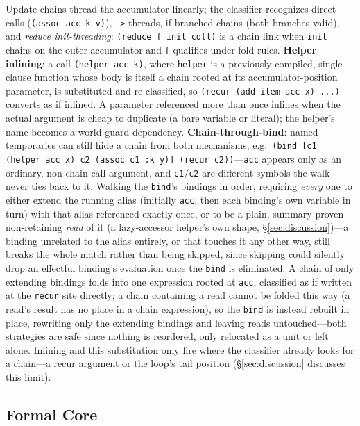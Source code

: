 \documentclass[sigplan,review,anonymous]{acmart}
\begin{document}
Update chains thread the accumulator linearly; the classifier recognizes direct calls (\texttt{(assoc acc k v)}), \texttt{->} threads, if-branched chains (both branches valid), and \emph{reduce init-threading}: \texttt{(reduce f init coll)} is a chain link when \texttt{init} chains on the outer accumulator and \texttt{f} qualifies under fold rules. \textbf{Helper inlining}: a call \texttt{(helper acc k)}, where \texttt{helper} is a previously-compiled, single-clause function whose body is itself a chain rooted at its accumulator-position parameter, is substituted and re-classified, so \texttt{(recur (add-item acc x) ...)} converts as if inlined. A parameter referenced more than once inlines when the actual argument is cheap to duplicate (a bare variable or literal); the helper's name becomes a world-guard dependency. \textbf{Chain-through-bind}: named temporaries can still hide a chain from both mechanisms, e.g.\ \texttt{(bind [c1 (helper acc x) c2 (assoc c1 :k y)] (recur c2))}---\texttt{acc} appears only as an ordinary, non-chain call argument, and \texttt{c1}/\texttt{c2} are different symbols the walk never ties back to it. Walking the \texttt{bind}'s bindings in order, requiring \emph{every} one to either extend the running alias (initially \texttt{acc}, then each binding's own variable in turn) with that alias referenced exactly once, or to be a plain, summary-proven non-retaining \emph{read} of it (a lazy-accessor helper's own shape, §\ref{sec:discussion})---a binding unrelated to the alias entirely, or that touches it any other way, still breaks the whole match rather than being skipped, since skipping could silently drop an effectful binding's evaluation once the \texttt{bind} is eliminated. A chain of only extending bindings folds into one expression rooted at \texttt{acc}, classified as if written at the \texttt{recur} site directly; a chain containing a read cannot be folded this way (a read's result has no place in a chain expression), so the \texttt{bind} is instead rebuilt in place, rewriting only the extending bindings and leaving reads untouched---both strategies are safe since nothing is reordered, only relocated as a unit or left alone. Inlining and this substitution only fire where the classifier already looks for a chain---a recur argument or the loop's tail position (§\ref{sec:discussion} discusses this limit).

\subsection{Formal Core}
\label{sec:formal}
\end{document}
